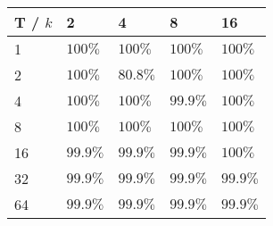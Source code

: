 \documentclass{article}
\begin{document}
    \begin{minipage}{0.45\textwidth}
        \begin{table}[H]
            \begin{center}
                \begin{tabular}[c]{|l|l|l|l|l|}
                    \hline
                    T / \( k \) & 2& 4 & 8 & 16   \\
                    \hline
                    1&\( 100\% \)&\( 100\% \)& \( 100\% \)&\( 100\% \) \\
                    \hline
                    2&\( 100\% \)&\( 80.8\% \)& \( 100\% \)&\( 100\% \) \\
                    \hline
                    4&\( 100\% \)&\( 100\% \)& \( 99.9\% \)&\( 100\% \) \\
                    \hline
                    8&\( 100\% \)&\( 100\% \)& \( 100\% \)&\( 100\% \) \\
                    \hline
                    16&\( 99.9\% \)&\( 99.9\% \)& \( 99.9\% \)&\( 100\% \) \\
                    \hline
                    32&\( 99.9\% \)&\( 99.9\% \)& \( 99.9\% \)&\( 99.9\% \) \\
                    \hline
                    64&\( 99.9\% \)&\( 99.9\% \)& \( 99.9\% \)&\( 99.9\% \) \\
                    \hline
                \end{tabular}
            \end{center}
        \end{table}
    \end{minipage}
\end{document}
